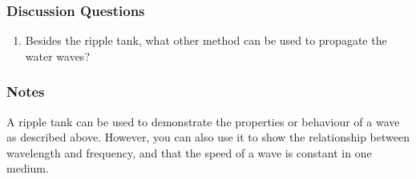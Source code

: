 \subsubsection*{Discussion Questions}
\begin{enumerate}
\item{Besides the ripple tank, what other method can be used to propagate the water waves?}
\end{enumerate}

\subsubsection*{Notes}
A ripple tank can be used to demonstrate the properties or behaviour of a wave as described above.  However, you can also use it to show the relationship between wavelength and frequency, and that the speed of a wave is constant in one medium.
